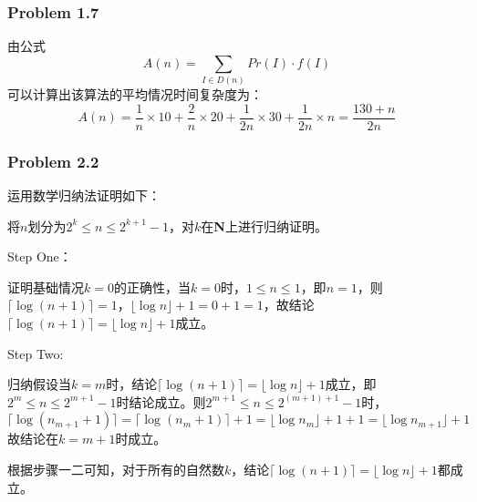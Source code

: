 \documentclass[UTF8,12pt]{article} %
\makeatletter
\theoremstyle{definition}
\newenvironment{proof}[1][\protect\proofname]{\par
\normalfont\topsep6\p@\@plus6\p@\relax
\trivlist
\itemindent\parindent
\item[\hskip\labelsep
\scshape
#1]\ignorespaces
}{%
\endtrivlist\@endpefalse
}
\renewcommand{\proofname}{\it{\textbf{证明}}}
\makeatother
\begin{document}
\subsubsection*{Problem 1.7}
\begin{proof}[\textbf{解答}]
由公式\[A(n) = \sum_{I \in D(n)}Pr(I)\cdot f(I)\]可以计算出该算法的平均情况时间复杂度为：\[A(n) = \displaystyle\frac{1}{n}\times 10 + \displaystyle\frac{2}{n}\times 20 +\displaystyle\frac{1}{2n}\times 30 + \displaystyle\frac{1}{2n}\times n = \displaystyle\frac{130+n}{2n}\]
\end{proof}


\subsubsection*{Problem 2.2}
\begin{proof}
运用数学归纳法证明如下：

将$n$划分为$2^{k} \leq n\leq 2^{k+1} -1$，对$k$在\textbf{N}上进行归纳证明。

Step One：

证明基础情况$k=0$的正确性，当$k=0$时，$1 \leq n\leq 1$，即$n=1$，则$\lceil \log (n+1)\rceil = 1$，$\lfloor \log n \rfloor + 1=0+1=1$，故结论$\lceil \log (n+1)\rceil = \lfloor \log n \rfloor + 1$成立。

Step Two:

归纳假设当$k=m$时，结论$\lceil \log (n+1)\rceil = \lfloor \log n \rfloor + 1$成立，即$2^{m } \leq n\leq 2^{m+1} -1$时结论成立。则$2^{m+1} \leq n\leq 2^{(m+1)+1} -1$时，\[\lceil \log (n_{m+1}+1)\rceil = \lceil \log (n_{m}+1)\rceil +1 = \lfloor \log n_{m} \rfloor + 1 +1 = \lfloor \log n_{m+1} \rfloor + 1\] 故结论在$k = m+1$时成立。

根据步骤一二可知，对于所有的自然数$k$，结论$\lceil \log (n+1)\rceil = \lfloor \log n \rfloor + 1$都成立。

\end{proof}
\end{document}
